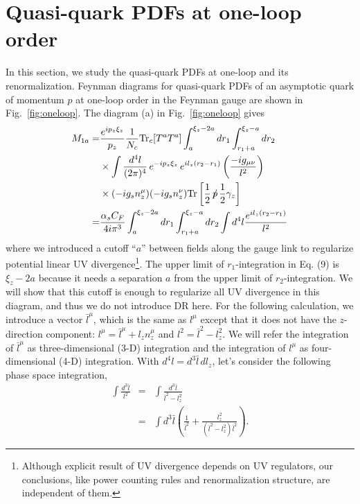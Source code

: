 \section{Quasi-quark PDFs at one-loop order}
\label{sec:oneloop}

In this section, we study the quasi-quark PDFs at one-loop and its renormalization. Feynman diagrams for quasi-quark PDFs of an asymptotic quark of momentum $p$ at one-loop order in the Feynman gauge are shown in Fig.~\ref{fig:oneloop}.  The diagram (a) in Fig.~\ref{fig:oneloop} gives
\begin{align}
\begin{split}\label{eq:1a0}
M_{1a}=&\frac{e^{i p_z \xi_z}}{p_z}\frac{1}{N_c} \text{Tr}_c[T^aT^a] \int_a^{\xi_z-2a}dr_1\int_{r_1+a}^{\xi_z-a}dr_2\\
&\times \int \frac{d^4l}{(2\pi)^4} \,e^{-i p_z \xi_z} \,e^{il_z(r_2-r_1)} \left(\frac{-ig_{\mu\nu}}{l^2}\right) \\
&\times (-ig_s n_z^\mu)(-ig_s n_z^\nu)  \text{Tr}\left[\frac{1}{2}\, \slashed{p}\, \frac{1}{2}\gamma_z\right]   \\
=& \frac{\alpha_s C_F}{4 i \pi^3} \int_a^{\xi_z-2a}dr_1\int_{r_1+a}^{\xi_z-a}dr_2 \int d^4l\frac{e^{il_z(r_2-r_1)}}{l^2}
\end{split}
\end{align}
where we introduced a cutoff ``$a$'' between fields along the gauge link to regularize potential linear UV divergence\footnote{Although explicit result of UV divergence depends on UV regulators, our conclusions, like power counting rules and renormalization structure, are independent of them.}. The upper limit of $r_1$-integration in Eq. (9) is $\xi_z-2a$ because it needs a separation $a$ from the upper limit of $r_2$-integration.  We will show that this cutoff is enough to regularize all UV divergence in this diagram, and thus we do not introduce DR here. For the following calculation, we introduce a vector $\bar{l}^\mu$, which is the same as $l^\mu$ except that it does not have the $z$-direction component: $l^\mu = \bar{l}^\mu + l_z n_z^\mu$ and $l^2=\bar{l}^2-l_z^2$. We will refer the integration of $\bar{l}^\mu$ as three-dimensional (3-D) integration and the integration of $l^\mu$ as four-dimensional (4-D) integration.  With $d^4l = d^{3}\bar{l}\, dl_z$, let's consider the following phase space integration,
\begin{eqnarray}\label{eq:3dexpansion}
\int \frac{d^{3}\bar{l}}{l^2} &=&
\int \frac{d^{3}\bar{l}}{\bar{l}^2-l_z^2}
\nonumber\\
&=& \int d^{3}\bar{l} \left( \frac{1}{\bar{l}^2}+ \frac{l_z^2}{(\bar{l}^2-l_z^2)\bar{l}^2}\right).
\end{eqnarray}

